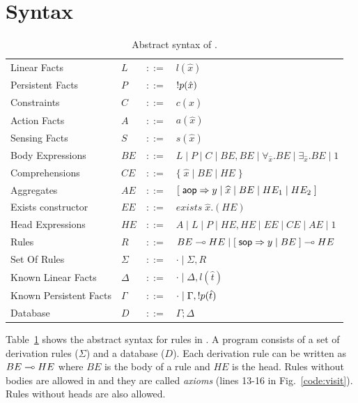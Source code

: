 \section{Syntax}

\renewcommand{\arraystretch}{1.5}

\begin{table}[h]
   \centering
\begin{tabular}{ l l c l }
  Linear Facts & $L$ & $::=$ & $l(\hat{x})$\\
  Persistent Facts & $P$ & $::=$ & ${!} p(\hat{x})$\\
  Constraints & $C$ & $::=$ & $c(\hat{x})$ \\
  Action Facts & $A$ & $::=$ & $a(\hat{x})$\\
  Sensing Facts & $S$ & $::=$ & $s(\hat{x})$\\
  Body Expressions & $BE$ & $::=$ & $L \; | \; P \; | \; C \; | \; BE, BE \; | \; \forall_{\widehat{x}}. BE \; | \; \exists_{\widehat{x}}. BE \; | \; 1$\\
  Comprehensions & $CE$ & $::=$ & $\{ \; \widehat{x} \; | \; BE \; | \; HE \; \}$ \\
  Aggregates & $AE$ & $::=$ & $[\;\mathsf{aop} \Rightarrow y \; | \; \widehat{x} \; | \; BE \; | \; HE_1 \; | \; HE_2 \;]$ \\
  Exists constructor & $EE$ & $::=$ & $exists \; \widehat{x}. (HE)$ \\
  Head Expressions & $HE$ & $::=$ & $A \; | \; L \; | \; P \; | \; HE, HE \; | \; EE \; | \; CE \; | \; AE \; | \; 1$\\
  Rules & $R$ & $::=$ & $BE \multimap HE \; | \; [\; \mathsf{sop} \Rightarrow y \; | \; BE \;] \multimap HE$ \\
  Set Of Rules & $\Sigma$ & $::=$ & $\cdot \; | \; \Sigma, R$\\
  Known Linear Facts & $\Delta$ & $::=$ & $\cdot \; | \; \Delta, l(\hat{t})$ \\
  Known Persistent Facts & $\Gamma$ & $::=$ & $\cdot \; | \; \Gamma, {!} p(\hat{t})$ \\
  Database & $D$ & $::=$ & $\Gamma; \Delta$ \\
\end{tabular}
\caption{Abstract syntax of \lang.}\label{tbl:ast}
\end{table}

\renewcommand{\arraystretch}{1.0}

Table~\ref{tbl:ast} shows the abstract syntax for rules in \lang.
A \lang program consists of a set of derivation rules ($\Sigma$) and a database ($D$).
Each derivation rule can be written as $BE \multimap HE$ where $BE$ is the body of a rule and
$HE$ is the head. Rules without bodies are allowed in \lang and they are called \textit{axioms} (lines 13-16 in Fig.~\ref{code:visit}). Rules without heads are also allowed.

